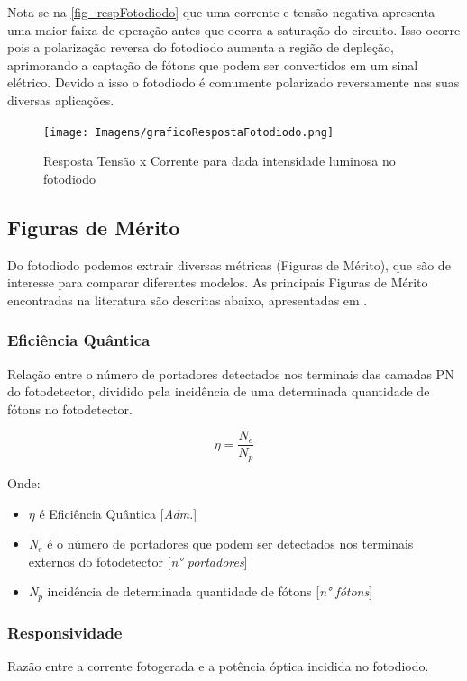 Nota-se na \autoref{fig_respFotodiodo} que uma corrente e tensão negativa apresenta uma maior faixa de operação antes que ocorra a saturação do circuito. Isso ocorre pois a polarização reversa do fotodiodo aumenta a região de depleção, aprimorando a captação de fótons que podem ser convertidos em um sinal elétrico. Devido a isso o fotodiodo é comumente polarizado reversamente nas suas diversas aplicações.

\begin{figure}[!h]
	\caption{\label{fig_respFotodiodo}Resposta Tensão x Corrente para dada intensidade luminosa no fotodiodo}
	\begin{center}
	    \texttt{[image: Imagens/graficoRespostaFotodiodo.png]}
	\end{center}
\end{figure}

\subsection{Figuras de M\'erito}
Do fotodiodo podemos extrair diversas m\'etricas (Figuras de M\'erito), que são de interesse para comparar diferentes modelos. As principais Figuras de M\'erito encontradas na literatura são descritas abaixo, apresentadas em \cite{LidianeCampos}.

\subsubsection{Eficiência Quântica}
Relação entre o número de portadores detectados nos terminais das camadas PN do fotodetector, dividido pela incidência de uma determinada quantidade de fótons no fotodetector.

\begin{equation}
    \eta = \frac{N_e}{N_p}
\end{equation}

Onde:
\begin{itemize}
    \item \textit{$\eta$} \'e Efici\^encia Qu\^antica [\textit{Adm.}]
    \item \textit{N$_e$} \'e o n\'umero de portadores que podem ser detectados nos terminais externos do fotodetector [\textit{n° portadores}]
    \item \textit{N$_p$} incid\^encia de determinada quantidade de f\'otons [\textit{n° f\'otons}]
\end{itemize}

\subsubsection{Responsividade}
Razão entre a corrente fotogerada e a potência óptica incidida no fotodiodo.

